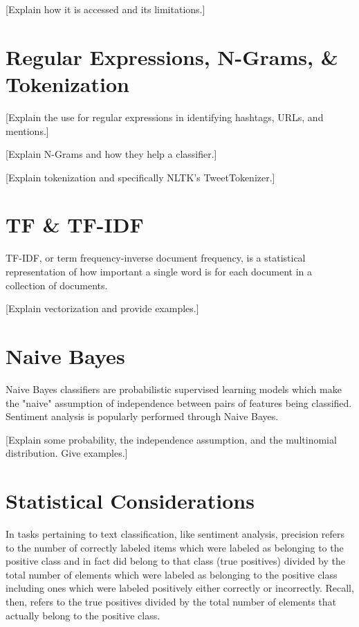 \documentclass[11pt, twoside, reqno]{book}
\begin{document}
[Explain how it is accessed and its limitations.]

\section{Regular Expressions, N-Grams, \& Tokenization}
\label{regular_expressions_etc}

[Explain the use for regular expressions in identifying hashtags, URLs, and mentions.]

[Explain N-Grams and how they help a classifier.]

[Explain tokenization and specifically NLTK's TweetTokenizer.]

\section{TF \& TF-IDF}
\label{tf_tf_idf}

TF-IDF, or term frequency-inverse document frequency, is a statistical representation of how important a single word is for each document in a collection of documents.

[Explain vectorization and provide examples.]

\section{Naive Bayes}
\label{naive_bayes}

Naive Bayes classifiers are probabilistic supervised learning models which make the "naive" assumption of independence between pairs of features being classified. Sentiment analysis is popularly performed through Naive Bayes.

[Explain some probability, the independence assumption, and the multinomial distribution. Give examples.]

\section{Statistical Considerations}
\label{statistical_considerations}

In tasks pertaining to text classification, like sentiment analysis, precision refers to the number of correctly labeled items which were labeled as belonging to the positive class and in fact did belong to that class (true positives) divided by the total number of elements which were labeled as belonging to the positive class including ones which were labeled positively either correctly or incorrectly. Recall, then, refers to the true positives divided by the total number of elements that actually belong to the positive class.
\end{document}
